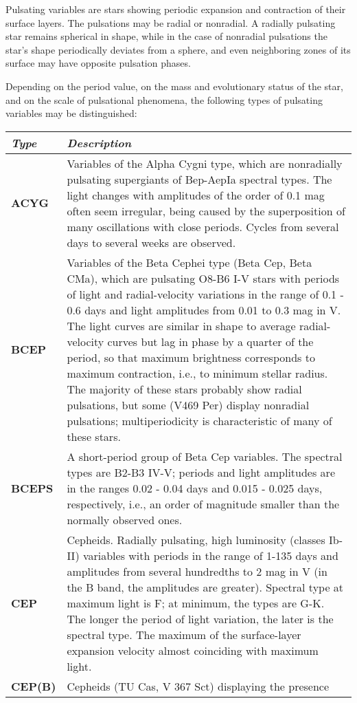 Pulsating variables are stars showing periodic expansion and contraction
of their surface layers. The pulsations may be radial or nonradial. A
radially pulsating star remains spherical in shape, while in the case of
nonradial pulsations the star's shape periodically deviates from a
sphere, and even neighboring zones of its surface may have opposite
pulsation phases.

Depending on the period value, on the mass and evolutionary status of
the star, and on the scale of pulsational phenomena, the following types
of pulsating variables may be distinguished:

\begin{longtabu} to \textwidth {l|X}
\toprule
\emph{Type} & \emph{Description}\tabularnewline
\midrule
\textbf{ACYG} & Variables of the Alpha Cygni type, which are nonradially
pulsating supergiants of Bep-AepIa spectral types. The light changes
with amplitudes of the order of 0.1 mag often seem irregular, being
caused by the superposition of many oscillations with close periods.
Cycles from several days to several weeks are observed.\tabularnewline
\midrule
\textbf{BCEP} & Variables of the Beta Cephei type (Beta Cep, Beta CMa),
which are pulsating O8-B6 I-V stars with periods of light and
radial-velocity variations in the range of 0.1 - 0.6 days and light
amplitudes from 0.01 to 0.3 mag in V. The light curves are similar in
shape to average radial-velocity curves but lag in phase by a quarter of
the period, so that maximum brightness corresponds to maximum
contraction, i.e., to minimum stellar radius. The majority of these
stars probably show radial pulsations, but some (V469 Per) display
nonradial pulsations; multiperiodicity is characteristic of many of
these stars.\tabularnewline
\midrule
\textbf{BCEPS} & A short-period group of Beta Cep variables. The
spectral types are B2-B3 IV-V; periods and light amplitudes are in the
ranges 0.02 - 0.04 days and 0.015 - 0.025 days, respectively, i.e., an
order of magnitude smaller than the normally observed
ones.\tabularnewline
\midrule
\textbf{CEP} & Cepheids. Radially pulsating, high luminosity (classes
Ib-II) variables with periods in the range of 1-135 days and amplitudes
from several hundredths to 2 mag in V (in the B band, the amplitudes are
greater). Spectral type at maximum light is F; at minimum, the types are
G-K. The longer the period of light variation, the later is the spectral
type. The maximum of the surface-layer expansion velocity almost
coinciding with maximum light.\tabularnewline
\midrule
\textbf{CEP(B)} & Cepheids (TU Cas, V 367 Sct) displaying the presence

\end{longtabu}
